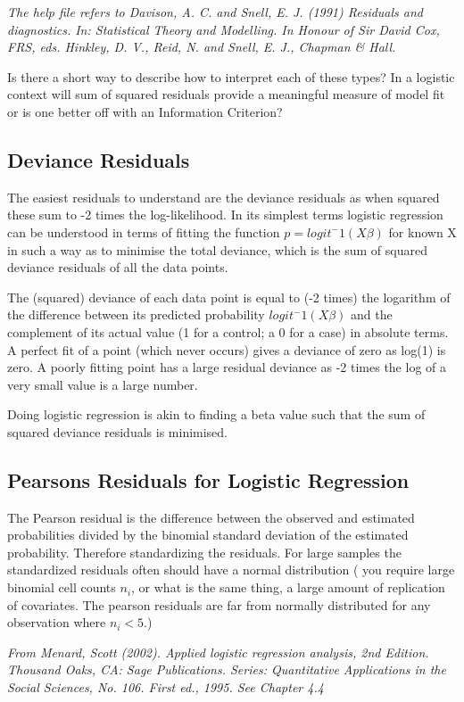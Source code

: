 \textit{The help file refers to Davison, A. C. and Snell, E. J. (1991) Residuals and diagnostics. In: Statistical Theory and Modelling. In Honour of Sir David Cox, FRS, eds. Hinkley, D. V., Reid, N. and Snell, E. J., Chapman \& Hall.}

Is there a short way to describe how to interpret each of these types? In a logistic context will sum of squared residuals provide a meaningful measure of model fit or is one better off with an Information Criterion?

\subsection{Deviance Residuals}
The easiest residuals to understand are the deviance residuals as when squared these sum to -2 times the log-likelihood. In its simplest terms logistic regression can be understood in terms of fitting the function $p=logit^−1(X\beta)$ for known X in such a way as to minimise the total deviance, which is the sum of squared deviance residuals of all the data points.

The (squared) deviance of each data point is equal to (-2 times) the logarithm of the difference between its predicted probability $logit^−1(X\beta)$ and the complement of its actual value (1 for a control; a 0 for a case) in absolute terms. A perfect fit of a point (which never occurs) gives a deviance of zero as log(1) is zero. A poorly fitting point has a large residual deviance as -2 times the log of a very small value is a large number.

Doing logistic regression is akin to finding a beta value such that the sum of squared deviance residuals is minimised.

\subsection{Pearsons Residuals for Logistic Regression}
The Pearson residual is the difference between the observed and estimated probabilities divided by the binomial standard deviation of the estimated probability. Therefore standardizing the residuals. For large samples the standardized residuals often should have a normal distribution ( you require large binomial cell counts $n_i$, or what is the same thing, a large amount of replication of covariates. The pearson residuals are far from normally distributed for any observation where $n_i<5$.)

\textit{From Menard, Scott (2002). Applied logistic regression analysis, 2nd Edition. Thousand Oaks, CA: Sage Publications. Series: Quantitative Applications in the Social Sciences, No. 106. First ed., 1995. See Chapter 4.4}



